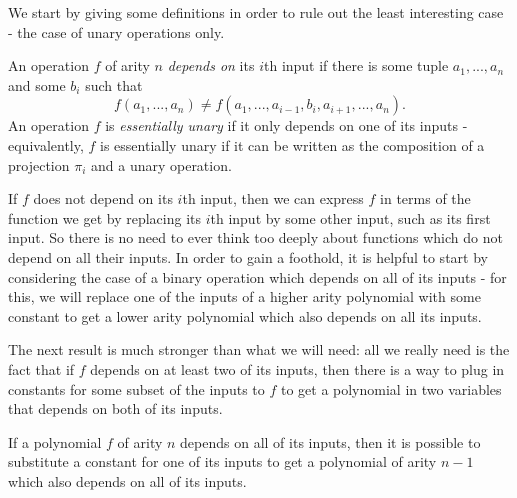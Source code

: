 \begin{appendices}
We start by giving some definitions in order to rule out the least interesting case - the case of unary operations only.

\begin{defn} An operation $f$ of arity $n$ \emph{depends on} its $i$th input if there is some tuple $a_1, ..., a_n$ and some $b_i$ such that
\[
f(a_1, ..., a_n) \ne f(a_1, ..., a_{i-1}, b_i, a_{i+1}, ..., a_n).
\]
An operation $f$ is \emph{essentially unary} if it only depends on one of its inputs - equivalently, $f$ is essentially unary if it can be written as the composition of a projection $\pi_i$ and a unary operation.
\end{defn}

If $f$ does not depend on its $i$th input, then we can express $f$ in terms of the function we get by replacing its $i$th input by some other input, such as its first input. So there is no need to ever think too deeply about functions which do not depend on all their inputs. In order to gain a foothold, it is helpful to start by considering the case of a binary operation which depends on all of its inputs - for this, we will replace one of the inputs of a higher arity polynomial with some constant to get a lower arity polynomial which also depends on all its inputs.

The next result is much stronger than what we will need: all we really need is the fact that if $f$ depends on at least two of its inputs, then there is a way to plug in constants for some subset of the inputs to $f$ to get a polynomial in two variables that depends on both of its inputs.

\begin{prop}\label{prop-depend-inputs} If a polynomial $f$ of arity $n$ depends on all of its inputs, then it is possible to substitute a constant for one of its inputs to get a polynomial of arity $n-1$ which also depends on all of its inputs.


\end{prop}
\end{appendices}
